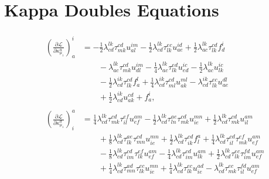 \section{Kappa Doubles Equations}
\label{app:kappa_equations}

\begin{align}
    &\begin{aligned}
        \left(\frac{\partial\mathscr{L}}{\partial\kappa^u_{\mu_1}} \right)^{i}_{a}
        &= - \frac{1}{2}\lambda^{lk}_{cd} \tau^{cd}_{mk} u^{im}_{al}
           - \frac{1}{2}\lambda^{lk}_{cd} \tau^{ec}_{lk} u^{id}_{ae}
           + \frac{1}{2}\lambda^{lk}_{ac} \tau^{cd}_{lk} f^{i}_{d}
        \\
        &\qquad
        - \lambda^{lk}_{ac} \tau^{cd}_{mk} u^{im}_{dl}
        - \frac{1}{4}\lambda^{lk}_{ac} \tau^{ed}_{lk} u^{ic}_{ed}
        - \frac{1}{2}\lambda^{lk}_{ac} u^{ic}_{lk}
        \\
        &\qquad
        - \frac{1}{2}\lambda^{ik}_{cd} \tau^{cd}_{lk} f^{l}_{a}
        + \frac{1}{4}\lambda^{ik}_{cd} \tau^{cd}_{ml} u^{ml}_{ak}
        - \lambda^{ik}_{cd} \tau^{ec}_{lk} u^{dl}_{ae}
        \\
        &\qquad
        + \frac{1}{2}\lambda^{ik}_{cd} u^{cd}_{ak} +
        f^{i}_{a},
    \end{aligned} \\
    &\begin{aligned}
        \left(\frac{\partial\mathscr{L}}{\partial\kappa^d_{\mu_1}} \right)^{a}_{i}
        &=
          \frac{1}{4}\lambda^{lk}_{cd} \tau^{cd}_{mk} \tau^{ef}_{il} u^{am}_{ef}
        - \frac{1}{2}\lambda^{lk}_{cd} \tau^{ae}_{ln} \tau^{cd}_{mk} u^{mn}_{ie}
        + \frac{1}{2}\lambda^{lk}_{cd} \tau^{cd}_{mk} u^{am}_{il}
        \\
        &\qquad
        + \frac{1}{8}\lambda^{lk}_{cd} \tau^{ae}_{lk} \tau^{cd}_{mn} u^{mn}_{ie}
        + \frac{1}{2}\lambda^{lk}_{cd} \tau^{cd}_{ik} f^{a}_{l}
        + \frac{1}{4}\lambda^{lk}_{cd} \tau^{cd}_{il} \tau^{ef}_{mk} u^{am}_{ef}
        \\
        &\qquad
        - \frac{1}{8}\lambda^{lk}_{cd} \tau^{cd}_{im} \tau^{ef}_{lk} u^{am}_{ef}
        - \frac{1}{4}\lambda^{lk}_{cd} \tau^{cd}_{im} u^{am}_{lk}
        + \frac{1}{2}\lambda^{lk}_{cd} \tau^{ec}_{lk} \tau^{fd}_{im} u^{am}_{ef}
        \\
        &\qquad
        + \frac{1}{4}\lambda^{lk}_{cd} \tau^{ad}_{mn} \tau^{ec}_{lk} u^{mn}_{ie}
        + \frac{1}{4}\lambda^{lk}_{cd} \tau^{ec}_{lk} u^{ad}_{ie}
        - \lambda^{lk}_{cd} \tau^{ec}_{mk} \tau^{fd}_{il} u^{am}_{ef}

\end{aligned}
\end{align}
